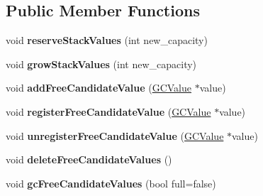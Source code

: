\subsection*{Public Member Functions}
\begin{DoxyCompactItemize}
\item 
void {\bfseries reserve\+Stack\+Values} (int new\+\_\+capacity)\hypertarget{class_object_script_1_1_o_s_1_1_core_a9c94c76580dc6463b43e300aa76ea121}{}\label{class_object_script_1_1_o_s_1_1_core_a9c94c76580dc6463b43e300aa76ea121}

\item 
void {\bfseries grow\+Stack\+Values} (int new\+\_\+capacity)\hypertarget{class_object_script_1_1_o_s_1_1_core_aa02f65c44bffda933ecb5644e25d851f}{}\label{class_object_script_1_1_o_s_1_1_core_aa02f65c44bffda933ecb5644e25d851f}

\item 
void {\bfseries add\+Free\+Candidate\+Value} (\hyperlink{struct_object_script_1_1_o_s_1_1_core_1_1_g_c_value}{G\+C\+Value} $\ast$value)\hypertarget{class_object_script_1_1_o_s_1_1_core_a5ffb5a382a5e6d45c7a9803075bb7216}{}\label{class_object_script_1_1_o_s_1_1_core_a5ffb5a382a5e6d45c7a9803075bb7216}

\item 
void {\bfseries register\+Free\+Candidate\+Value} (\hyperlink{struct_object_script_1_1_o_s_1_1_core_1_1_g_c_value}{G\+C\+Value} $\ast$value)\hypertarget{class_object_script_1_1_o_s_1_1_core_a67f0385797660a0976b61cb865b441b0}{}\label{class_object_script_1_1_o_s_1_1_core_a67f0385797660a0976b61cb865b441b0}

\item 
void {\bfseries unregister\+Free\+Candidate\+Value} (\hyperlink{struct_object_script_1_1_o_s_1_1_core_1_1_g_c_value}{G\+C\+Value} $\ast$value)\hypertarget{class_object_script_1_1_o_s_1_1_core_a56ef93852079835e593592da276e8b6a}{}\label{class_object_script_1_1_o_s_1_1_core_a56ef93852079835e593592da276e8b6a}

\item 
void {\bfseries delete\+Free\+Candidate\+Values} ()\hypertarget{class_object_script_1_1_o_s_1_1_core_a4f8f37684af163bf9ab949d371f058cf}{}\label{class_object_script_1_1_o_s_1_1_core_a4f8f37684af163bf9ab949d371f058cf}

\item 
void {\bfseries gc\+Free\+Candidate\+Values} (bool full=false)\hypertarget{class_object_script_1_1_o_s_1_1_core_a10f3e8dab19f7606165b15f595492965}{}\label{class_object_script_1_1_o_s_1_1_core_a10f3e8dab19f7606165b15f595492965}


\end{DoxyCompactItemize}
